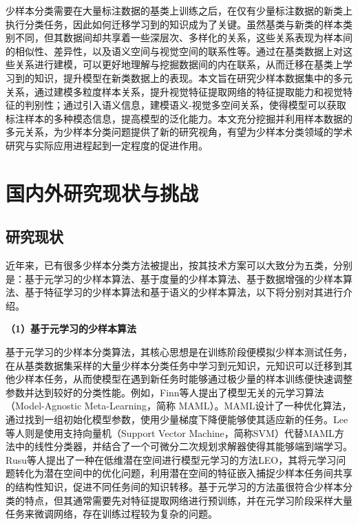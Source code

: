 少样本分类需要在大量标注数据的基类上训练之后，在仅有少量标注数据的新类上执行分类任务，因此如何迁移学习到的知识成为了关键。虽然基类与新类的样本类别不同，但其数据间却共享着一些深层次、多样化的关系，这些关系表现为样本间的相似性、差异性，以及语义空间与视觉空间的联系性等。通过在基类数据上对这些关系进行建模，可以更好地理解与挖掘数据间的内在联系，从而迁移在基类上学习到的知识，提升模型在新类数据上的表现。本文旨在研究少样本数据集中的多元关系，通过建模多粒度样本关系，提升视觉特征提取网络的特征提取能力和视觉特征的判别性；通过引入语义信息，建模语义-视觉多空间关系，使得模型可以获取标注样本的多种模态信息，提高模型的泛化能力。本文充分挖掘并利用样本数据的多元关系，为少样本分类问题提供了新的研究视角，有望为少样本分类领域的学术研究与实际应用进程起到一定程度的促进作用。


\section[\hspace{-2pt}国内外研究现状与挑战]{{\heiti{} \hspace{-8pt}国内外研究现状与挑战}}\label{section1: 国内外研究现状与挑战}

\subsection[\hspace{-2pt}研究现状]{{\heiti{} \hspace{-8pt}研究现状}}\label{section1: 研究现状}

近年来，已有很多少样本分类方法被提出，按其技术方案可以大致分为五类，分别是：基于元学习的少样本算法、基于度量的少样本算法、基于数据增强的少样本算法、基于特征学习的少样本算法和基于语义的少样本算法，以下将分别对其进行介绍。

\textbf{（1）基于元学习的少样本算法}

基于元学习的少样本分类算法\cite{MAML, lee2019meta, LEO, 元学习}，其核心思想是在训练阶段便模拟少样本测试任务，在从基类数据集采样的大量少样本分类任务中学习到元知识，元知识可以迁移到其他少样本任务，从而使模型在遇到新任务时能够通过极少量的样本训练便快速调整参数并达到较好的分类性能。例如，Finn等人\cite{MAML}提出了模型无关的元学习算法（Model-Agnostic Meta-Learning，简称 MAML）。MAML设计了一种优化算法，通过找到一组初始化模型参数，使用少量梯度下降便能够使其适应新的任务。Lee等人\cite{lee2019meta}则是使用支持向量机（Support Vector Machine，简称SVM）代替MAML方法中的线性分类器，并结合了一个可微分二次规划求解器使得其能够端到端学习。Rusu等人\cite{LEO}提出了一种在低维潜在空间进行模型元学习的方法LEO，其将元学习问题转化为潜在空间中的优化问题，利用潜在空间的特征嵌入捕捉少样本任务间共享的结构性知识，促进不同任务间的知识转移。基于元学习的方法虽很符合少样本分类的特点，但其通常需要先对特征提取网络进行预训练，并在元学习阶段采样大量任务来微调网络，存在训练过程较为复杂的问题。

